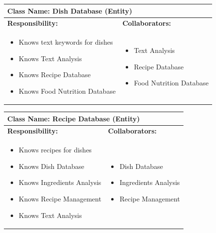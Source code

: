 \documentclass[]{article}
\begin{document}
\begin{table}[H]
	\centering
	\begin{tabular}{|p{7cm}|p{7cm}|}
	\hline 
	 \multicolumn{2}{|l|}{\textbf{Class Name:} Dish Database (Entity) }\\
	\hline
	\textbf{Responsibility:} & \textbf{Collaborators:} \\
	\hline
	\raggedright
	\begin{itemize}
		\item Knows text keywords for dishes
		\item Knows Text Analysis
		\item Knows Recipe Database
		\item Knows Food Nutrition Database
	\end{itemize}
	\vspace{1in} & 
	\begin{itemize}
		\item Text Analysis
		\item Recipe Database
		\item Food Nutrition Database
	\end{itemize} \\
	\hline
	\end{tabular}
\end{table}

\begin{table}[H]
	\centering
	\begin{tabular}{|p{7cm}|p{7cm}|}
	\hline 
	 \multicolumn{2}{|l|}{\textbf{Class Name:} Recipe Database (Entity) }\\
	\hline
	\textbf{Responsibility:} & \textbf{Collaborators:} \\
	\hline
	\raggedright
	\begin{itemize}
		\item Knows recipes for dishes
		\item Knows Dish Database
		\item Knows Ingredients Analysis
		\item Knows Recipe Management
		\item Knows Text Analysis
	\end{itemize}
	\vspace{1in} & 
	\begin{itemize}
		\item Dish Database
		\item Ingredients Analysis
		\item Recipe Management
	\end{itemize} \\
	\hline
	\end{tabular}
\end{table}
\end{document}
